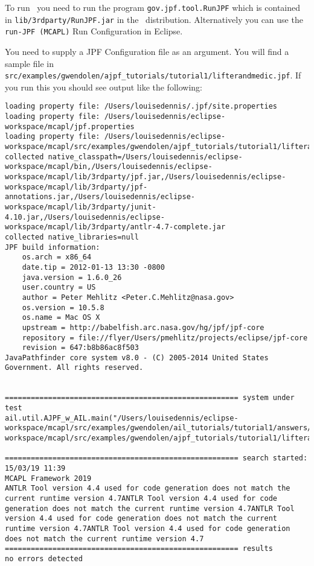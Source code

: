 To run \ajpf\ you need to run the program \texttt{gov.jpf.tool.RunJPF} which is contained in \texttt{lib/3rdparty/RunJPF.jar} in the \mcapl\ distribution.  Alternatively you can use the \texttt{run-JPF (MCAPL)} Run Configuration in Eclipse.

You need to supply a JPF Configuration file as an argument.  You will find a sample file in \texttt{src/examples/gwendolen/ajpf\_tutorials/tutorial1/lifterandmedic.jpf}.  If you run this you should see output like the following:

\begin{verbatim}
loading property file: /Users/louisedennis/.jpf/site.properties
loading property file: /Users/louisedennis/eclipse-workspace/mcapl/jpf.properties
loading property file: /Users/louisedennis/eclipse-workspace/mcapl/src/examples/gwendolen/ajpf_tutorials/tutorial1/lifterandmedic.jpf
collected native_classpath=/Users/louisedennis/eclipse-workspace/mcapl/bin,/Users/louisedennis/eclipse-workspace/mcapl/lib/3rdparty/jpf.jar,/Users/louisedennis/eclipse-workspace/mcapl/lib/3rdparty/jpf-annotations.jar,/Users/louisedennis/eclipse-workspace/mcapl/lib/3rdparty/junit-4.10.jar,/Users/louisedennis/eclipse-workspace/mcapl/lib/3rdparty/antlr-4.7-complete.jar
collected native_libraries=null
JPF build information:
	os.arch = x86_64
	date.tip = 2012-01-13 13:30 -0800
	java.version = 1.6.0_26
	user.country = US
	author = Peter Mehlitz <Peter.C.Mehlitz@nasa.gov>
	os.version = 10.5.8
	os.name = Mac OS X
	upstream = http://babelfish.arc.nasa.gov/hg/jpf/jpf-core
	repository = file://flyer/Users/pmehlitz/projects/eclipse/jpf-core
	revision = 647:b8b86ac8f503
JavaPathfinder core system v8.0 - (C) 2005-2014 United States Government. All rights reserved.


====================================================== system under test
ail.util.AJPF_w_AIL.main("/Users/louisedennis/eclipse-workspace/mcapl/src/examples/gwendolen/ail_tutorials/tutorial1/answers/ex2.ail","/Users/louisedennis/eclipse-workspace/mcapl/src/examples/gwendolen/ajpf_tutorials/tutorial1/lifterandmedic.psl","1")

====================================================== search started: 15/03/19 11:39
MCAPL Framework 2019
ANTLR Tool version 4.4 used for code generation does not match the current runtime version 4.7ANTLR Tool version 4.4 used for code generation does not match the current runtime version 4.7ANTLR Tool version 4.4 used for code generation does not match the current runtime version 4.7ANTLR Tool version 4.4 used for code generation does not match the current runtime version 4.7
====================================================== results
no errors detected


\end{verbatim}
